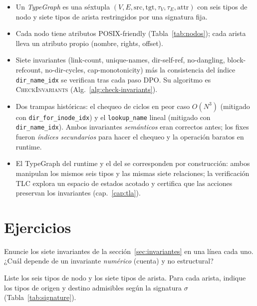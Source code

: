 \begin{itemize}
  \item Un \emph{TypeGraph} es una séxtupla
    $(V, E, \mathrm{src}, \mathrm{tgt}, \tau_V, \tau_E, \mathrm{attr})$
    con seis tipos de nodo y siete tipos de arista restringidos por una
    signatura fija.
  \item Cada nodo tiene atributos POSIX-friendly (Tabla~\ref{tab:nodos});
    cada arista lleva un atributo propio (nombre, rights, offset).
  \item Siete invariantes (link-count, unique-names, dir-self-ref,
    no-dangling, block-refcount, no-dir-cycles, cap-monotonicity) más
    la consistencia del índice \texttt{dir\_name\_idx} se verifican tras
    cada paso DPO. Su algoritmo es \textsc{CheckInvariants}
    (Alg.~\ref{alg:check-invariants}).
  \item Dos trampas históricas: el chequeo de ciclos en peor caso
    $O(N^3)$ (mitigado con \texttt{dir\_for\_inode\_idx}) y el
    \texttt{lookup\_name} lineal (mitigado con \texttt{dir\_name\_idx}).
    Ambos invariantes \emph{semánticos} eran correctos antes; los fixes
    fueron \emph{índices secundarios} para hacer el chequeo y la
    operación baratos en runtime.
  \item El TypeGraph del runtime y el del  se
    corresponden por construcción: ambos manipulan los mismos seis
    tipos y las mismas siete relaciones; la verificación TLC explora un
    espacio de estados acotado y certifica que las acciones preservan
    los invariantes (cap.~\ref{cap:tla}).
\end{itemize}

\section*{Ejercicios}

\begin{ejercicio}[\dificultad{$\star$}]
\label{ej:tg-1}
Enuncie los siete invariantes de la sección~\ref{sec:invariantes} en una
línea cada uno. ¿Cuál depende de un invariante \emph{numérico} (cuenta)
y no estructural?
\end{ejercicio}

\begin{ejercicio}[\dificultad{$\star$}]
\label{ej:tg-2}
Liste los seis tipos de nodo y los siete tipos de arista. Para cada
arista, indique los tipos de origen y destino admisibles según la
signatura $\sigma$ (Tabla~\ref{tab:signature}).
\end{ejercicio}

